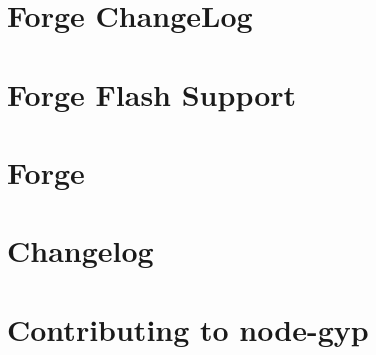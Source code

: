 \documentclass[twoside]{book}
\newcommand{\+}{\discretionary{\mbox{\scriptsize$\hookleftarrow$}}{}{}}
\begin{document}
\chapter{Forge Change\+Log}
\label{md__c___users_vaishnavi_jadhav__desktop__developer_code_mean_stack_example_client_node_modules_node_forge__c_h_a_n_g_e_l_o_g}

\chapter{Forge Flash Support}
\label{md__c___users_vaishnavi_jadhav__desktop__developer_code_mean_stack_example_client_node_modules_node_forge_flash__r_e_a_d_m_e}

\chapter{Forge}
\label{md__c___users_vaishnavi_jadhav__desktop__developer_code_mean_stack_example_client_node_modules_node_forge__r_e_a_d_m_e}

\chapter{Changelog}
\label{md__c___users_vaishnavi_jadhav__desktop__developer_code_mean_stack_example_client_node_modules_node_gyp__c_h_a_n_g_e_l_o_g}

\chapter{Contributing to node-\/gyp}
\label{md__c___users_vaishnavi_jadhav__desktop__developer_code_mean_stack_example_client_node_modules_n6e04f3f9d61577bcca0a7da0f88f3b79}

\end{document}

